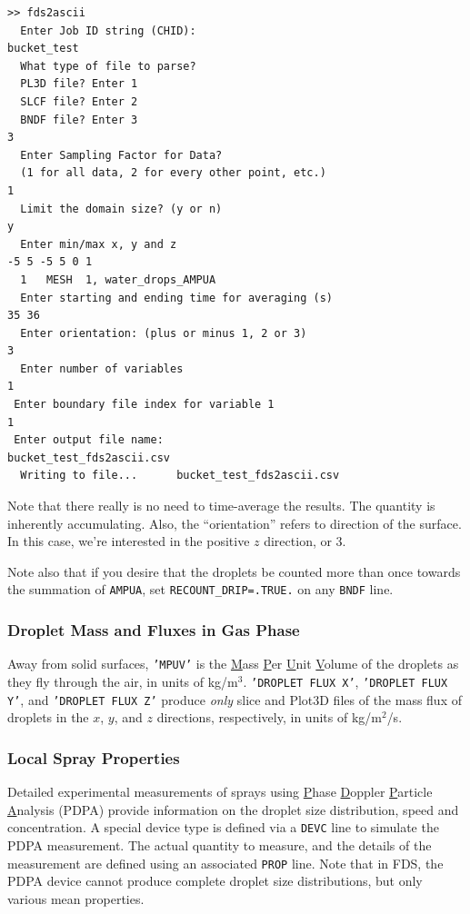 \documentclass[11pt]{book}
\newcommand{\ct}{\tt\small}
\begin{document}
\footnotesize
\begin{verbatim}
>> fds2ascii
  Enter Job ID string (CHID):
bucket_test
  What type of file to parse?
  PL3D file? Enter 1
  SLCF file? Enter 2
  BNDF file? Enter 3
3
  Enter Sampling Factor for Data?
  (1 for all data, 2 for every other point, etc.)
1
  Limit the domain size? (y or n)
y
  Enter min/max x, y and z
-5 5 -5 5 0 1
  1   MESH  1, water_drops_AMPUA
  Enter starting and ending time for averaging (s)
35 36
  Enter orientation: (plus or minus 1, 2 or 3)
3
  Enter number of variables
1
 Enter boundary file index for variable 1
1
 Enter output file name:
bucket_test_fds2ascii.csv
  Writing to file...      bucket_test_fds2ascii.csv
\end{verbatim}

\normalsize \noindent
Note that there really is no need to time-average the results. The quantity is inherently accumulating. Also, the
``orientation'' refers to direction of the surface. In this case, we're interested in the positive $z$ direction, or 3.

Note also that if you desire that the droplets be counted more than once towards the summation of {\ct AMPUA}, set {\ct RECOUNT\_DRIP=.TRUE.} on any {\ct BNDF} line.



\subsubsection{Droplet Mass and Fluxes in Gas Phase}

Away from solid surfaces, {\ct 'MPUV'} is the \underline{M}ass \underline{P}er \underline{U}nit \underline{V}olume of the droplets as they fly through
the air, in units of kg/m$^3$.  {\ct 'DROPLET FLUX X'},  {\ct 'DROPLET FLUX Y'}, and {\ct 'DROPLET FLUX Z'} produce {\em only} slice and Plot3D files
of the mass flux of droplets in the $x$, $y$, and $z$ directions, respectively, in units of kg/m$^2$/s.

\subsubsection{Local Spray Properties}
\label{PDPA}

Detailed experimental measurements of sprays using \underline{P}hase \underline{D}oppler \underline{P}article
\underline{A}nalysis (PDPA) provide information on the droplet size distribution, speed and concentration.
A special device type is defined via a {\ct DEVC} line to simulate the PDPA measurement. The actual quantity to measure, and the details of the
measurement are defined using an associated {\ct PROP} line. Note that in FDS, the PDPA device cannot produce complete droplet size
distributions, but only various mean properties.
\end{document}
